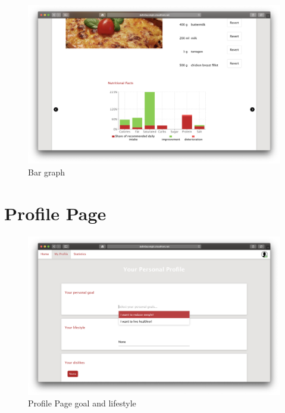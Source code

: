 \vspace{-2em}
\begin{figure}[H]
	\captionsetup{justification=centering}
	\begin{center}
		\includegraphics[scale=0.25]{Ressourcen/img/screenshots/screenshotN.png}
		\vspace{-3em}
		\caption{Bar graph}
	\end{center}
\end{figure}


\section*{Profile Page}

\vspace{-2em}
\begin{figure}[H]
	\captionsetup{justification=centering}
	\begin{center}
		\includegraphics[scale=0.25]{Ressourcen/img/screenshots/screenshotO.png}
		\vspace{-3em}
		\caption{Profile Page goal and lifestyle}
	\end{center}
\end{figure}


